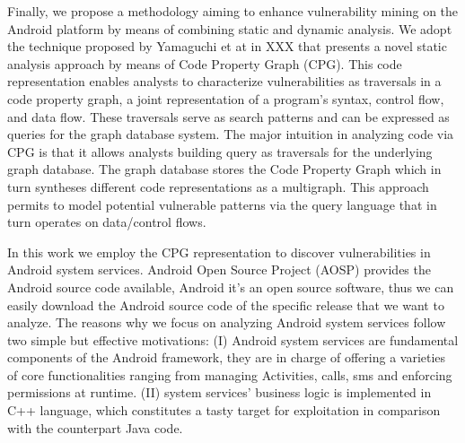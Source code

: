 Finally, we propose a methodology aiming to enhance vulnerability mining on the Android platform by means of combining static and dynamic analysis. 
We adopt the technique proposed by Yamaguchi et at in XXX that presents a novel static analysis approach by means of Code Property Graph (CPG). This code representation enables analysts to characterize vulnerabilities as traversals in a code property graph, a joint representation of a program’s syntax, control flow, and data flow. These traversals serve as search patterns and can be expressed as queries for the graph database system. The major intuition in analyzing code via CPG is that it allows analysts building query as traversals for the underlying graph database. The graph database stores the Code Property Graph which in turn syntheses different code representations as a multigraph. This approach permits to model  potential vulnerable patterns via the query language that in turn operates on data/control flows.


In this work we employ the CPG representation to discover vulnerabilities in Android system services. Android Open Source Project (AOSP) provides the Android source code available, Android it's an open source software, thus we can easily download the Android source code of the specific release that we want to analyze.  The reasons why we focus on analyzing Android system services follow two simple but effective motivations: (I) Android system services are fundamental components of the Android framework, they are in charge of offering a varieties of core functionalities ranging from managing Activities, calls, sms and enforcing permissions at runtime. (II) system services' business logic is implemented in C++ language, which constitutes a tasty target for exploitation in comparison with the counterpart Java code.

